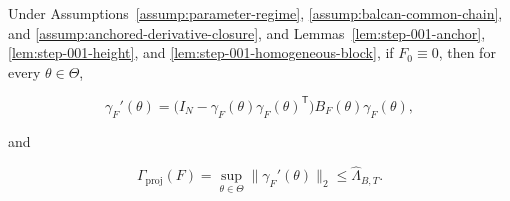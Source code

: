 \begin{proposition}
\label{prop:step-001-projective}

Under Assumptions~\ref{assump:parameter-regime}, \ref{assump:balcan-common-chain}, and
\ref{assump:anchored-derivative-closure}, and Lemmas~\ref{lem:step-001-anchor},
\ref{lem:step-001-height}, and \ref{lem:step-001-homogeneous-block}, if \(F_0\equiv0\), then for every
\(\theta\in\Theta\),

\begin{equation}
\label{eq:appendix-display-013}
\gamma_F'(\theta)
=\bigl(I_N-\gamma_F(\theta)\gamma_F(\theta)^{\mathsf T}\bigr)
B_F(\theta)\gamma_F(\theta),
\end{equation}

and

\begin{equation}
\label{eq:appendix-display-014}
\Gamma_{\mathrm{proj}}(F)
=\sup_{\theta\in\Theta}\|\gamma_F'(\theta)\|_2
\leq\widehat\Lambda_{B,T}.
\end{equation}


\end{proposition}

